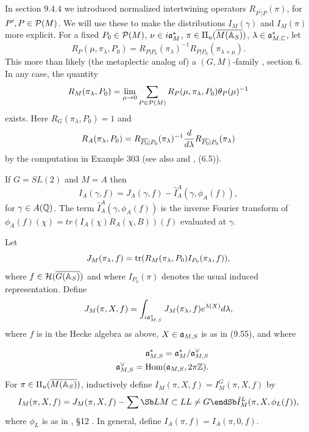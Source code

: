 In section 9.4.4 we introduced normalized intertwining operators
$R_{P^{\prime}|P}(\pi)$, for $P^{\prime},P\in {\cal P}(M)$.
We will use these to make the distributions
$I_M(\gamma)$ and $I_M(\pi)$ more explicit.
For a fixed $P_0\in {\cal P}(M)$,
$\nu\in i{\frak{a}}_M^*$,
$\pi\in \Pi_u(\overline{M({\Bbb{A}}_S)})$,
$\lambda\in {\frak{a}}_{M,{\Bbb{C}}}^*$, let
\begin{equation}
R_P(\mu,\pi_\lambda,P_0)
=R_{P|P_0}(\pi_\lambda)^{-1}R_{P|P_0}(\pi_{\lambda+\mu}) .
\end{equation}
This more than likely (the metaplectic analog of) a
$(G,M)$-family \cite{A11}, section 6. In any case, the quantity
\[
R_M(\pi_\lambda,P_0)
=\lim_{\mu\rightarrow 0}
\sum_{P\in {\cal P}(M)}
R_P(\mu,\pi_\lambda,P_0)\theta_P(\mu)^{-1}
\]
exists. Here $R_G(\pi_\lambda,P_0)=1$ and
\[
R_A(\pi_\lambda,P_0)=
R_{\overline{P_0}|P_0}(\pi_\lambda)^{-1}
{d\over d\lambda}
R_{\overline{P_0}|P_0}(\pi_\lambda)
\]
by the computation in Example 303 (see also \cite{A11} and
\cite{A6}, (6.5)).

\begin{example}
If $G=SL(2)$ and $M=A$ then
\[
I_A(\gamma,f)
=J_A(\gamma,f)-
\hat{I}_A^A(\gamma,\phi_A(f)),
\]
for $\gamma\in A({\Bbb{Q}})$.
The term $\hat{I}_A^A(\gamma,\phi_A(f))$
is the inverse Fourier transform of
$\phi_A(f)(\chi)=tr(I_A(\chi)R_A(\chi,B))(f)$ evaluated at
$\gamma$. 
\end{example}

Let
\begin{equation}
J_M(\pi_\lambda,f)=
{\rm tr}(R_M(\pi_\lambda,P_0)
I_{P_0}(\pi_\lambda,f)),
\end{equation}
where $f\in {\cal{H}}(\overline{G({\Bbb{A}}_S)})$ and where
$I_{P_0}(\pi)$ denotes the usual induced representation.
Define
\begin{equation}
J_M(\pi,X,f)
=\int_{i{\frak{a}}^*_{M,S}}
J_M(\pi_\lambda,f)e^{\lambda(X)}d\lambda,
\end{equation}
where $f$ is in the Hecke algebra as above, $X\in {\frak{a}}_{M,S}$
is as in (9.55), and where

\begin{eqnarray*}
&&{\frak{a}}^*_{M,S}
={\frak{a}}^*_{M}/{\frak{a}}^{\vee}_{M,S}\\
&&{\frak{a}}^{\vee}_{M,S}={\rm Hom}({\frak{a}}_{M,S},2\pi {\Bbb Z}).
\end{eqnarray*}
For
$\pi\in \Pi_u(\overline{M({\Bbb{A}}_S)})$,
inductively define $I_M(\pi,X,f)=I_M^G(\pi,X,f)$ by
\begin{equation}
I_M(\pi,X,f)
=J_M(\pi,X,f)-
\sum\Sb L\\ M\subset L\\ L\not= G\endSb
\hat{I}_M^L(\pi,X,\phi_L(f)),
\end{equation}
where $\phi_L$ is as in \cite{A11}, \S 12 .
In general, define $I_A(\pi,f)=I_A(\pi,0,f)$.

